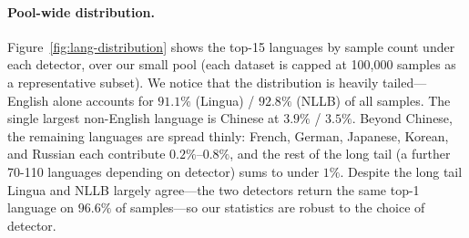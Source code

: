 \paragraph{Pool-wide distribution.} Figure~\ref{fig:lang-distribution} shows the top-15 languages by sample count under each detector, over our small pool (each dataset is capped at 100{,}000 samples as a representative subset). We notice that the distribution is heavily tailed---English alone accounts for $91.1\%$ (Lingua) / $92.8\%$ (NLLB) of all samples. The single largest non-English language is Chinese at $3.9\%$ / $3.5\%$. Beyond Chinese, the remaining languages are spread thinly: French, German, Japanese, Korean, and Russian each contribute $0.2\%$--$0.8\%$, and the rest of the long tail (a further 70-110 languages depending on detector) sums to under $1\%$. Despite the long tail Lingua and NLLB largely agree---the two detectors return the same top-1 language on $96.6\%$ of samples---so our statistics are robust to the choice of detector.

\figlangdistribution

